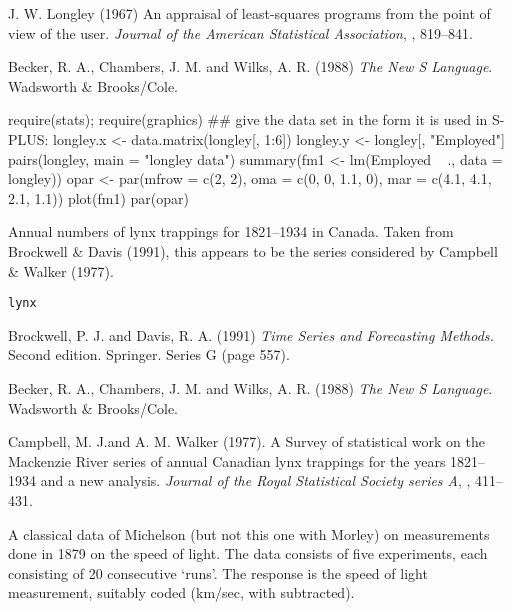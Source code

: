 %
\begin{Source}\relax
J. W. Longley (1967)
An appraisal of least-squares programs from the point of view of the
user.
\emph{Journal of the American Statistical Association}, ,
819--841.
\end{Source}
%
\begin{References}\relax
Becker, R. A., Chambers, J. M. and Wilks, A. R. (1988)
\emph{The New S Language}.
Wadsworth \& Brooks/Cole.
\end{References}
%
\begin{Examples}
\begin{ExampleCode}
require(stats); require(graphics)
## give the data set in the form it is used in S-PLUS:
longley.x <- data.matrix(longley[, 1:6])
longley.y <- longley[, "Employed"]
pairs(longley, main = "longley data")
summary(fm1 <- lm(Employed ~ ., data = longley))
opar <- par(mfrow = c(2, 2), oma = c(0, 0, 1.1, 0),
            mar = c(4.1, 4.1, 2.1, 1.1))
plot(fm1)
par(opar)
\end{ExampleCode}
\end{Examples}
%
\begin{Description}\relax
Annual numbers of lynx trappings for 1821--1934 in Canada. Taken from
Brockwell \& Davis (1991), this appears to be the series considered
by Campbell \& Walker (1977).
\end{Description}
%
\begin{Usage}
\begin{verbatim}
lynx
\end{verbatim}
\end{Usage}
%
\begin{Source}\relax
Brockwell, P. J. and Davis, R. A. (1991) \emph{Time
Series and Forecasting Methods.}  Second edition.
Springer. Series G (page 557).
\end{Source}
%
\begin{References}\relax
Becker, R. A., Chambers, J. M. and Wilks, A. R. (1988)
\emph{The New S Language}.
Wadsworth \& Brooks/Cole.

Campbell, M. J.and A. M.  Walker (1977).  A Survey of
statistical work on the Mackenzie River series of annual
Canadian lynx trappings for the years  1821--1934 and
a new analysis.
\emph{Journal of the Royal Statistical Society series A},
, 411--431.
\end{References}
%
\begin{Description}\relax
A classical data of Michelson (but not this one with Morley) on
measurements done in 1879 on the speed of light.  The data consists of
five experiments, each consisting of 20 consecutive `runs'.
The response is the speed of light measurement, suitably coded
(km/sec, with  subtracted).
\end{Description}
